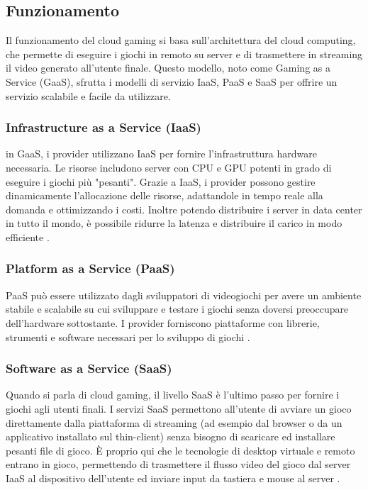\documentclass[12pt,a4paper,openright,twoside]{book}
\begin{document}
\subsection{Funzionamento}
\label{subsec:funzionamento}

Il funzionamento del cloud gaming si basa sull'architettura del cloud computing, che permette di eseguire i giochi in remoto su server e di trasmettere in streaming il video generato all'utente finale. Questo modello, noto come Gaming as a Service (GaaS), sfrutta i modelli di servizio IaaS, PaaS e SaaS per offrire un servizio scalabile e facile da utilizzare.

\subsubsection{Infrastructure as a Service (IaaS)}
in GaaS, i provider utilizzano IaaS per fornire l'infrastruttura hardware necessaria. Le risorse includono server con CPU e GPU potenti in grado di eseguire i giochi più "pesanti". Grazie a IaaS, i provider possono gestire dinamicamente l'allocazione delle risorse, adattandole in tempo reale alla domanda e ottimizzando i costi. Inoltre potendo distribuire i server in data center in tutto il mondo, è possibile ridurre la latenza e distribuire il carico in modo efficiente \cite{HARLE2023}.

\subsubsection{Platform as a Service (PaaS)}
PaaS può essere utilizzato dagli sviluppatori di videogiochi per avere un ambiente stabile e scalabile su cui sviluppare e testare i giochi senza doversi preoccupare dell'hardware sottostante. I provider forniscono piattaforme con librerie, strumenti e software necessari per lo sviluppo di giochi \cite{HARLE2023}.

\subsubsection{Software as a Service (SaaS)}
Quando si parla di cloud gaming, il livello SaaS è l'ultimo passo per fornire i giochi agli utenti finali. I servizi SaaS permettono all'utente di avviare un gioco direttamente dalla piattaforma di streaming (ad esempio dal browser o da un applicativo installato sul thin-client) senza bisogno di scaricare ed installare pesanti file di gioco. È proprio qui che le tecnologie di desktop virtuale e remoto entrano in gioco, permettendo di trasmettere il flusso video del gioco dal server IaaS al dispositivo dell'utente ed inviare input da tastiera e mouse al server \cite{HARLE2023}.
\end{document}
